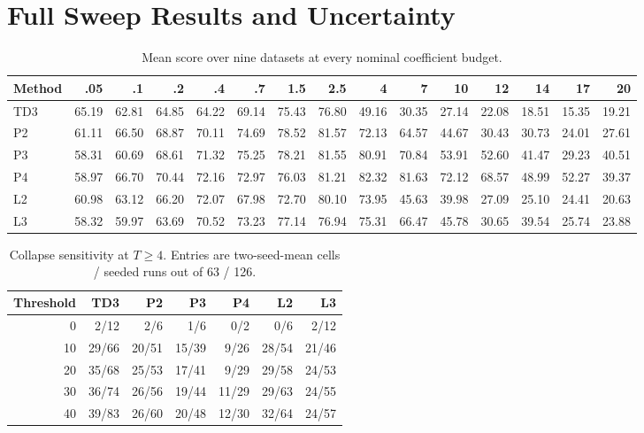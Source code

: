 \documentclass[letterpaper]{article}
\begin{document}
\section{Full Sweep Results and Uncertainty}
\label{app:results}

\begin{table}[h]
\caption{Mean score over nine datasets at every nominal coefficient budget.}
\centering
\scriptsize
\setlength{\tabcolsep}{2.8pt}
\begin{tabular}{lrrrrrrrrrrrrrr}
\toprule
Method&.05&.1&.2&.4&.7&1.5&2.5&4&7&10&12&14&17&20\\
\midrule
TD3&65.19&62.81&64.85&64.22&69.14&75.43&76.80&49.16&30.35&27.14&22.08&18.51&15.35&19.21\\
P2&61.11&66.50&68.87&70.11&74.69&78.52&81.57&72.13&64.57&44.67&30.43&30.73&24.01&27.61\\
P3&58.31&60.69&68.61&71.32&75.25&78.21&81.55&80.91&70.84&53.91&52.60&41.47&29.23&40.51\\
P4&58.97&66.70&70.44&72.16&72.97&76.03&81.21&82.32&81.63&72.12&68.57&48.99&52.27&39.37\\
L2&60.98&63.12&66.20&72.07&67.98&72.70&80.10&73.95&45.63&39.98&27.09&25.10&24.41&20.63\\
L3&58.32&59.97&63.69&70.52&73.23&77.14&76.94&75.31&66.47&45.78&30.65&39.54&25.74&23.88\\
\bottomrule
\end{tabular}
\label{tab:budget_means}
\end{table}

\begin{table}[h]
\caption{Collapse sensitivity at $T\ge4$. Entries are two-seed-mean cells / seeded runs out of 63 / 126.}
\centering
\small
\begin{tabular}{r|rrrrrr}
\toprule
Threshold&TD3&P2&P3&P4&L2&L3\\
\midrule
0&2/12&2/6&1/6&0/2&0/6&2/12\\
10&29/66&20/51&15/39&9/26&28/54&21/46\\
20&35/68&25/53&17/41&9/29&29/58&24/53\\
30&36/74&26/56&19/44&11/29&29/63&24/55\\
40&39/83&26/60&20/48&12/30&32/64&24/57\\
\bottomrule
\end{tabular}
\label{tab:thresholds}
\end{table}
\end{document}

